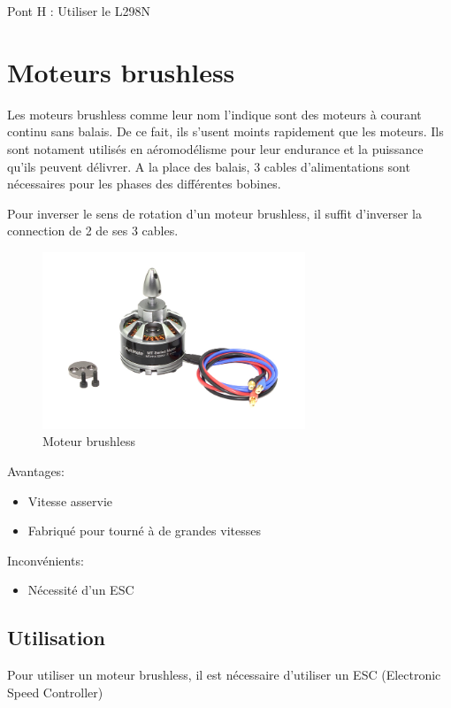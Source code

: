 \documentclass[a4paper, 11pt]{report}
\begin{document}
Pont H : Utiliser le L298N

\section{Moteurs brushless}
Les moteurs brushless comme leur nom l'indique sont des moteurs à courant continu sans balais. De ce fait, ils s'usent moints rapidement que les moteurs. Ils sont notament utilisés en aéromodélisme pour leur endurance et la puissance qu'ils peuvent délivrer. A la place des balais, 3 cables d'alimentations sont nécessaires pour les phases des différentes bobines.

Pour inverser le sens de rotation d'un moteur brushless, il suffit d'inverser la connection de 2 de ses 3 cables.

\begin{figure}[h]
\begin{centering}
\includegraphics[width=0.7\textwidth]{images/MoteurBrushless.jpg}
\caption{Moteur brushless}
\par\end{centering}
\end{figure}

Avantages:
\begin{itemize}
\item Vitesse asservie
\item Fabriqué pour tourné à de grandes vitesses
\end{itemize}

Inconvénients:
\begin{itemize}
\item Nécessité d'un ESC
\end{itemize}

\subsection{Utilisation}
Pour utiliser un moteur brushless, il est nécessaire d'utiliser un  ESC (Electronic Speed Controller) 
\end{document}
